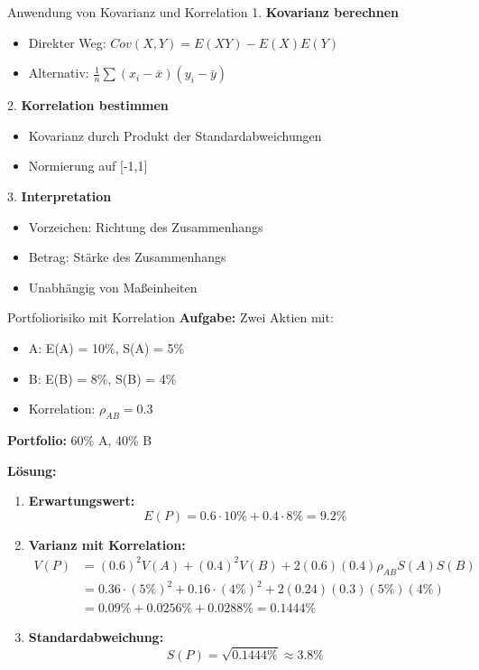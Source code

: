 \begin{KR}{Anwendung von Kovarianz und Korrelation}
1. \textbf{Kovarianz berechnen}
   \begin{itemize}
   \item Direkter Weg: $Cov(X,Y) = E(XY) - E(X)E(Y)$
   \item Alternativ: $\frac{1}{n}\sum(x_i-\bar{x})(y_i-\bar{y})$
   \end{itemize}

2. \textbf{Korrelation bestimmen}
   \begin{itemize}
   \item Kovarianz durch Produkt der Standardabweichungen
   \item Normierung auf [-1,1]
   \end{itemize}

3. \textbf{Interpretation}
   \begin{itemize}
   \item Vorzeichen: Richtung des Zusammenhangs
   \item Betrag: Stärke des Zusammenhangs
   \item Unabhängig von Maßeinheiten
   \end{itemize}
\end{KR}

\begin{example2}{Portfoliorisiko mit Korrelation}
\textbf{Aufgabe:} Zwei Aktien mit:
\begin{itemize}
\item A: E(A) = 10\%, S(A) = 5\%
\item B: E(B) = 8\%, S(B) = 4\%
\item Korrelation: $\rho_{AB} = 0.3$
\end{itemize}

\textbf{Portfolio:} 60\% A, 40\% B

\textbf{Lösung:}
\begin{enumerate}
\item \textbf{Erwartungswert:}
   $$E(P) = 0.6 \cdot 10\% + 0.4 \cdot 8\% = 9.2\%$$

\item \textbf{Varianz mit Korrelation:}
   \begin{align*}
   V(P) &= (0.6)^2V(A) + (0.4)^2V(B) + 2(0.6)(0.4)\rho_{AB}S(A)S(B) \\
   &= 0.36 \cdot (5\%)^2 + 0.16 \cdot (4\%)^2 + 2(0.24)(0.3)(5\%)(4\%) \\
   &= 0.09\% + 0.0256\% + 0.0288\% = 0.1444\%
   \end{align*}

\item \textbf{Standardabweichung:}
   $$S(P) = \sqrt{0.1444\%} \approx 3.8\%$$
\end{enumerate}
\end{example2}

